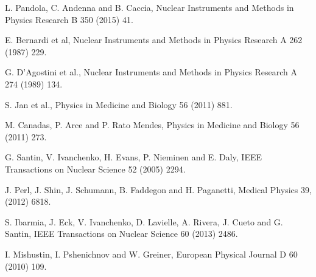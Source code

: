  L. Pandola, C. Andenna and B. Caccia,
                        Nuclear Instruments and Methods in Physics Research B 350 (2015) 41.

 E. Bernardi et al,
                     Nuclear Instruments and Methods in Physics Research A 262 (1987) 229.

 G. D'Agostini et al.,
                     Nuclear Instruments and Methods in Physics Research A 274 (1989) 134.

 S. Jan et al.,
                     Physics in Medicine and Biology 56 (2011) 881.


 M. Canadas, P. Arce and P. Rato Mendes, 
                      Physics in Medicine and Biology 56 (2011) 273.

 G. Santin, V. Ivanchenko, H. Evans, P. Nieminen and E. Daly,
                     IEEE Transactions on Nuclear Science 52 (2005) 2294.

 J. Perl, J. Shin, J. Schumann, B. Faddegon and H. Paganetti,
                      Medical Physics 39, (2012) 6818.

 S. Ibarmia, J. Eck, V. Ivanchenko, D. Lavielle, A. Rivera,
                         J. Cueto and G. Santin,
                         IEEE Transactions on Nuclear Science 60 (2013) 2486.

 I. Mishustin, I. Pshenichnov and W. Greiner, 
                          European Physical Journal D 60 (2010) 109.
